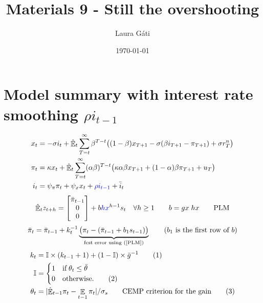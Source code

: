 \documentclass[11pt]{article}
\renewcommand{\[}{\begin{equation}}
\renewcommand{\]}{\end{equation}}
\DeclareMathOperator{\E}{\mathbb{E}}
\newcommand\numberthis{\addtocounter{equation}{1}\tag{\theequation}} %
\begin{document}
\linespread{1.0}

\title{Materials 9 - Still the overshooting}
\author{Laura G\'ati} 
\date{\today}
\maketitle


\tableofcontents




\newpage
\section{Model summary with interest rate smoothing $\rho i_{t-1}$}
\begin{align}
x_t &=  -\sigma i_t +\hat{\E}_t \sum_{T=t}^{\infty} \beta^{T-t }\big( (1-\beta)x_{T+1} - \sigma(\beta i_{T+1} - \pi_{T+1}) +\sigma r_T^n \big)  \label{prestons18}  \\
\pi_t &= \kappa x_t +\hat{\E}_t \sum_{T=t}^{\infty} (\alpha\beta)^{T-t }\big( \kappa \alpha \beta x_{T+1} + (1-\alpha)\beta \pi_{T+1} + u_T\big) \label{prestons19}  \\
i_t &= \psi_{\pi}\pi_t + \psi_{x} x_t  + \textcolor{blue}{\rho i_{t-1}} + \bar{i}_t \label{TR}
\end{align}
\begin{equation}
\hat{\E}_t z_{t+h} =  \begin{bmatrix}\bar{\pi}_{t-1} \\ 0 \\ 0 \end{bmatrix}+ b\textcolor{blue}{hx}^{h-1}s_t  \quad \forall h\geq 1 \quad \quad b = gx \; hx \quad \quad \text{PLM} \label{PLM}
\end{equation}
\begin{equation}
\bar{\pi}_{t} = \bar{\pi}_{t-1} +k_t^{-1}\underbrace{\big(\pi_{t} -(\bar{\pi}_{t-1}+b_1s_{t-1}) \big)}_{\text{fcst error using (\ref{PLM})} } \quad \quad  \text{($b_1$ is the first row of $b$)}
\end{equation}
 \begin{align*}
k_t & = \mathbb{I}\times(k_{t-1}+1) + (1-\mathbb{I}) \times \bar{g}^{-1}  \label{gain} \numberthis\\
\mathbb{I} & = \begin{cases} 1 \quad \text{if} \; \theta_t \leq \bar{\theta}  \\ 0 \quad \text{otherwise.}\numberthis
\end{cases} \\
\theta_t & = |\hat{\E}_{t-1}\pi_t - \E_{t-1}\pi_t| / \sigma_s \quad \quad \text{CEMP criterion for the gain}\label{criterion}\numberthis
\end{align*}
\end{document}
